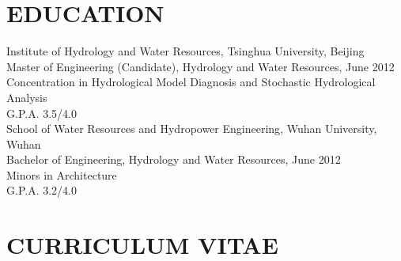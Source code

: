 \documentclass{res}
\begin{document}
 


\address{\bf  PRESENT ADDRESS\\\#310 New Hydrolic Buiding\\Tsinghua University, Beijing 100001 \\+86 13366720253}
\address{\bf PERMANENT ADDRESS \\ \#102 Residential Building  \\  Dongguan Middle School
, Feixian 273400 \\  +86 0539-5012705}
                                  
\begin{resume}

         
\section{EDUCATION}      

    Institute of Hydrology and Water Resources, Tsinghua University, Beijing  \\        
    Master of Engineering (Candidate), Hydrology and Water Resources, June 2012   \\       
    Concentration in Hydrological Model Diagnosis and Stochastic Hydrological Analysis     \\         
    G.P.A. 3.5/4.0  \\ 
 
    School of Water Resources and Hydropower Engineering, Wuhan University, Wuhan  \\        
    Bachelor of Engineering, Hydrology and Water Resources, June 2012   \\        
    Minors in Architecture\\        
    G.P.A. 3.2/4.0  
          

\section{CURRICULUM VITAE}


\end{resume}
\end{document}
